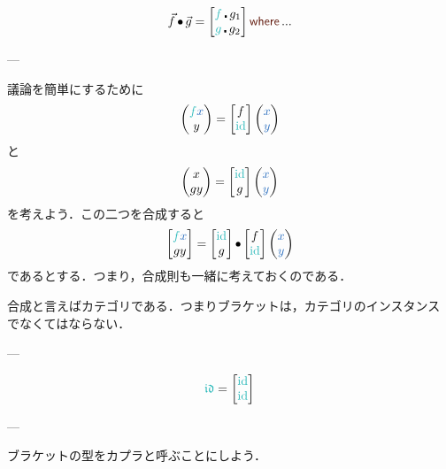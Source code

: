 \documentclass[a5paper,twoside,fleqn,draft]{jsbook}
\def\keywordColor{Sepia}
\def\varColor{NavyBlue}
\def\funcColor{BlueGreen}
\newcommand{\mKeyword}[1]{\textcolor{\keywordColor}{\mathsf{#1}}}
\newcommand{\mWhereKeyword}{\mKeyword{where}}
\DeclareMathOperator{\mWhere}{\mWhereKeyword}
\newcommand{\mVar}[1]{\textcolor{\varColor}{#1}}
\newcommand{\mXVar}{\mVar{x}}
\newcommand{\mYVar}{\mVar{y}}
\newcommand{\mFunc}[1]{\textcolor{\funcColor}{#1}}
\newcommand{\mSpecialFunc}[1]{\textcolor{\funcColor}{\textrm{#1}}}
\newcommand{\mVarSpecialFunc}[1]{\textcolor{\funcColor}{\mathfrak{#1}}}
\newcommand{\mFFunc}{{\mFunc{f}}}
\newcommand{\mGFunc}{\mFunc{g}}
\DeclareMathOperator{\mId}{\mSpecialFunc{id}}
\DeclareMathOperator{\mIdCat}{\mVarSpecialFunc{id}}
\DeclareMathOperator{\mCompFunc}{\centerdot}
\DeclareMathOperator{\mCompCat}{\bullet}
\newcommand{\mPairWith}[2]{\begin{pmatrix}#1\\#2\end{pmatrix}}
\newcommand{\mArrow}[1]{\Vec{#1}}
\begin{document}
\begin{equation}
  \mArrow{f}\mCompCat\mArrow{g}
  =
  \begin{bmatrix}
    \mFFunc\mCompFunc g_1\\
    \mGFunc\mCompFunc g_2
  \end{bmatrix}
  \mWhere...
\end{equation}

---

議論を簡単にするために
\begin{equation}
  \mPairWith{\mFFunc\mXVar}{y}
  =\begin{bmatrix}
  f\\
  \mId
  \end{bmatrix}
  \mPairWith{\mXVar}{\mYVar}
\end{equation}
と
\begin{equation}
  \mPairWith{x}{gy}
  =\begin{bmatrix}
  \mId\\
  g
  \end{bmatrix}
  \mPairWith{\mXVar}{\mYVar}
\end{equation}
を考えよう．この二つを合成すると
\begin{equation}
  \begin{bmatrix}
    \mFFunc\mXVar\\
    gy
  \end{bmatrix}
  =
  \begin{bmatrix}
    \mId\\
    g
  \end{bmatrix}
  \mCompCat
  \begin{bmatrix}
    f\\
    \mId
  \end{bmatrix}
  \mPairWith{\mXVar}{\mYVar}
\end{equation}
であるとする．つまり，合成則も一緒に考えておくのである．

合成と言えばカテゴリである．つまりブラケットは，カテゴリのインスタンス
でなくてはならない．

---

\begin{equation}
  \mIdCat
  =
  \begin{bmatrix}
    \mId\\
    \mId
  \end{bmatrix}
\end{equation}

---

ブラケットの型をカプラと呼ぶことにしよう．
\end{document}
